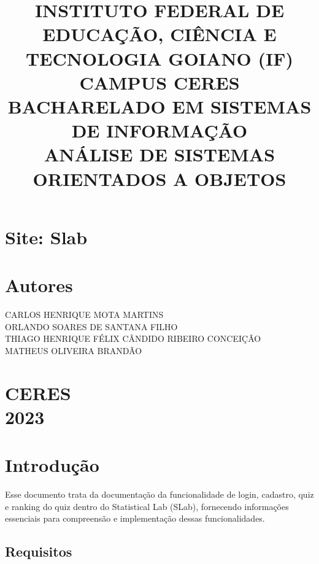\documentclass{article}
\begin{document}
\title{INSTITUTO FEDERAL DE EDUCAÇÃO, CIÊNCIA E TECNOLOGIA GOIANO (IF)\\ CAMPUS CERES\\ BACHARELADO EM SISTEMAS DE INFORMAÇÃO\\ANÁLISE DE SISTEMAS ORIENTADOS A OBJETOS}
\doublespacing
\date{}
\maketitle
\vspace{50pt}

\section*{Site: Slab}
\vspace{70pt}

\begin{center}
 \large
 \section*{Autores} 
 CARLOS HENRIQUE MOTA MARTINS\\
 ORLANDO SOARES DE SANTANA FILHO \\
 THIAGO HENRIQUE FÉLIX CÂNDIDO RIBEIRO CONCEIÇÃO\\
 MATHEUS OLIVEIRA BRANDÃO\\
 
 
\section*{CERES\\2023}
\vspace{70pt}

\tableofcontents
\end{center}
\vspace{290pt}

\section{Introdução}
{Esse documento trata da documentação da funcionalidade de login, cadastro, quiz e ranking do quiz dentro do Statistical Lab (SLab), fornecendo informações essenciais para compreensão e implementação dessas funcionalidades.}
\vspace{40pt}



\subsection{Requisitos}
\vspace{30pt}
\end{document}
